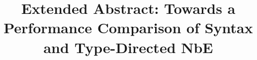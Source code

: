 \documentclass[sigplan,nonacm]{acmart}
\title{Extended Abstract: Towards a Performance Comparison of Syntax and Type-Directed NbE}
\begin{document}
\begin{abstract}
        
\end{abstract}

\maketitle


%


%

\end{document}
